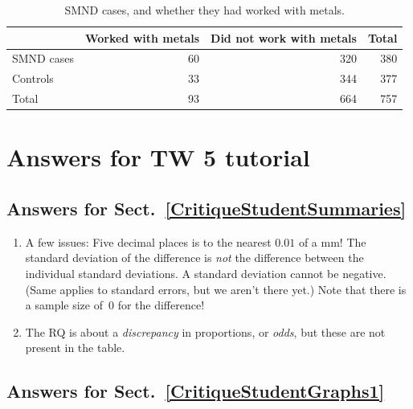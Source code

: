 \documentclass[
  11pt,
  a4paper,
  krantz2]{krantz}
\providecommand{\tightlist}{%
  \setlength{\itemsep}{0pt}\setlength{\parskip}{0pt}}
\begin{document}
\begin{footnotesize}
\begin{table}
\centering
\caption{\label{tab:SMNDAnswerTable}SMND cases, and whether they had worked with metals.}
\centering
\fontsize{8}{10}\selectfont
\begin{tabular}[t]{lrrr}
\toprule
\textbf{ } & \textbf{Worked with metals} & \textbf{Did not work with metals} & \textbf{Total}\\
\midrule
SMND cases & 60 & 320 & 380\\
Controls & 33 & 344 & 377\\
Total & 93 & 664 & 757\\
\bottomrule
\end{tabular}
\end{table}

\section{Answers for TW 5 tutorial}\label{Lecture5Answers}

\subsection*{Answers for Sect.~\ref{CritiqueStudentSummaries}}\label{answers-for-sect.-refcritiquestudentsummaries}

\begin{enumerate}
\def\labelenumi{\arabic{enumi}.}
\tightlist
\item
  A few issues:
  Five decimal places is to the nearest \(0.01\) of a mm!
  The standard deviation of the difference is \emph{not} the difference between the individual standard deviations.
  A standard deviation cannot be negative. (Same applies to standard errors, but we aren't there yet.)
  Note that there is a sample size of~\(0\) for the difference!
\item
  The RQ is about a \emph{discrepancy} in proportions, or \emph{odds}, but these are not present in the table.
\end{enumerate}

\subsection*{Answers for Sect.~\ref{CritiqueStudentGraphs1}}\label{answers-for-sect.-refcritiquestudentgraphs1}


\end{footnotesize}
\end{document}
